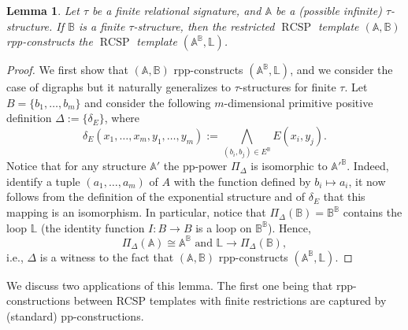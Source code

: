 \documentclass{article}
\newtheorem{lemma}[theorem]{Lemma}
\theoremstyle{definition}
\theoremstyle{remark}
\DeclareMathOperator{\RCSP}{RCSP}
\newcommand{\bA}{{\mathbb A}}
\newcommand{\bB}{{\mathbb B}}
\newcommand{\bL}{{\mathbb L}}
\begin{document}
\begin{lemma}\label{lem:rpp-construction-exponential}
    Let $\tau$ be a finite relational signature, and $\bA$ be a (possible infinite) $\tau$-structure.
    If $\bB$ is a finite $\tau$-structure, then the restricted $\RCSP$ template $(\bA, \bB)$ 
    rpp-constructs the $\RCSP$ template $(\bA^\bB, \bL)$. 
\end{lemma}
\begin{proof}
    We first show that $(\bA,\bB)$ rpp-constructs $(\bA^\bB,\bL)$, and we consider the case
    of digraphs but it naturally generalizes to $\tau$-structures for finite $\tau$. Let
    $B = \{b_1,\dots, b_m\}$ and consider the following $m$-dimensional  primitive positive definition
    $\Delta := \{\delta_E\}$, where
    \[
        \delta_E(x_1,\dots, x_m, y_1,\dots, y_m):= \bigwedge_{(b_i,b_j)\in E^\bB}E(x_i, y_j).
    \]
    Notice that for any structure $\bA'$ the pp-power $\Pi_\Delta$ is isomorphic to $\bA'^\bB$. 
    Indeed, identify a tuple $(a_1,\dots, a_m)$ of $A$ with the function defined by $b_i\mapsto a_i$,
    it now follows from the definition of the exponential structure and of $\delta_E$ that this
    mapping is an isomorphism. In particular, notice that $\Pi_\Delta(\bB) = \bB^\bB$ contains the 
    loop $\bL$ (the identity function $I\colon B\to B$ is a loop on $\bB^\bB$). Hence,
    \[
        \Pi_\Delta(\bA) \cong \bA^\bB \text{ and } \bL\to \Pi_\Delta(\bB),
    \]
    i.e., $\Delta$ is a witness to the fact that $(\bA,\bB)$ rpp-constructs $(\bA^\bB,\bL)$.
\end{proof}


We discuss two applications of this lemma. The first one being that rpp-constructions
between RCSP templates with finite restrictions are captured by (standard) pp-constructions. 
\end{document}
